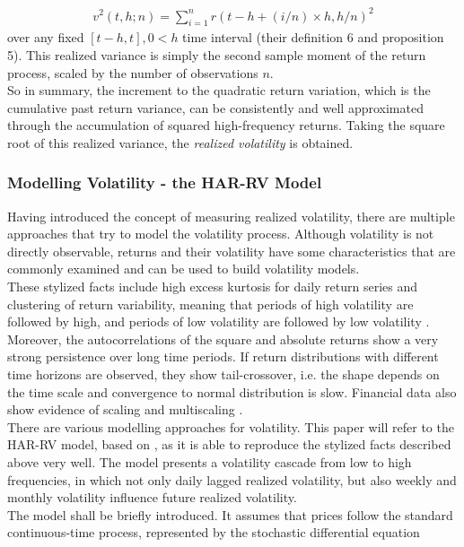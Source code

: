 \begin{align}\label{eq:RV-andersen}
v^2(t,h;n) = \sum_{i=1}^{n} r(t-h+(i/n) \times h,h/n)^2
\end{align}
over any fixed $[t-h,t], 0 < h$ time interval (their definition 6 and proposition 5). This realized variance is simply the second sample moment of the return process, scaled by the number of observations $n$.\\
So in summary, the increment to the quadratic return variation, which is the cumulative past return variance, can be consistently and well approximated through the accumulation of squared high-frequency returns. Taking the square root of this realized variance, the \emph{realized volatility} is obtained.


\subsubsection{Modelling Volatility - the HAR-RV Model}\label{sec:222HAR-RV}
Having introduced the concept of measuring realized volatility, there are multiple approaches that try to model the volatility process. Although volatility is not directly observable, returns and their volatility have some characteristics that are commonly examined and can be used to build volatility models. \\
These stylized facts include high excess kurtosis for daily return series and clustering of return variability, meaning that periods of high volatility are followed by high, and periods of low volatility are followed by low volatility \parencite{tsay2005}. Moreover, the autocorrelations of the square and absolute returns show a very strong persistence over long time periods. If return distributions with different time horizons are observed, they show tail-crossover, i.e. the shape depends on the time scale and convergence to normal distribution is slow. Financial data also show evidence of scaling and multiscaling \parencite{corsi2009}. \\
There are various modelling approaches for volatility. This paper will refer to the HAR-RV model, based on \textcite{corsi2009}, as it is able to reproduce the stylized facts described above very well. The model presents a volatility cascade from low to high frequencies, in which not only daily lagged realized volatility, but also weekly and monthly volatility influence future realized volatility.\\
The model shall be briefly introduced. It assumes that prices follow the standard continuous-time process, represented by the stochastic differential equation
